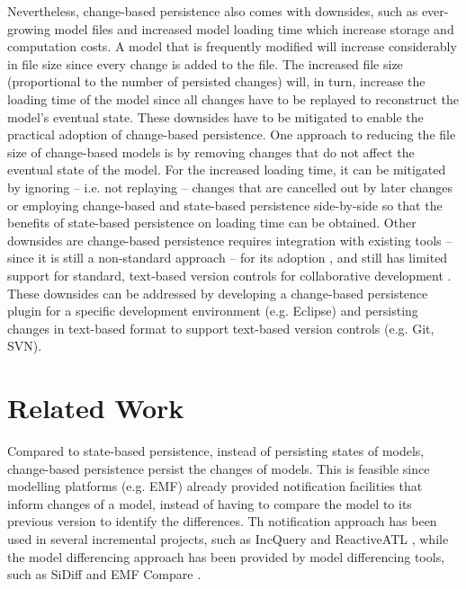 \documentclass[sigplan,review,anonymous]{acmart}\settopmatter{printfolios=true,printccs=false,printacmref=false}
\begin{document}
Nevertheless, change-based persistence also comes with downsides, such as ever-growing model files \cite{DBLP:journals/entcs/RobbesL07,DBLP:conf/edoc/KoegelHLHD10} and increased model loading time \cite{mens2002state} which increase storage and computation costs. A model that is frequently modified will increase considerably in file size since every change is added to the file. The increased file size (proportional to the number of persisted changes) will, in turn, increase the loading time of the model since all changes have to be replayed to reconstruct the model's eventual state. These downsides have to be mitigated to enable the practical adoption of change-based persistence. One approach to reducing the file size of change-based models is by removing changes that do not affect the eventual state of the model. For the increased loading time, it can be mitigated by ignoring -- i.e. not replaying -- changes that are cancelled out by later changes or employing change-based and state-based persistence side-by-side so that the benefits of state-based persistence on loading time can be obtained. Other downsides are change-based persistence requires integration with existing tools -- since it is still a non-standard approach -- for its adoption \cite{koegel2010emfstore}, and still has limited support for standard, text-based version controls for collaborative development \cite{koegel2010emfstore}. These downsides can be addressed by developing a change-based persistence plugin for a specific development environment (e.g. Eclipse) and persisting changes in text-based format to support text-based version controls (e.g. Git, SVN).


\section{Related Work}
Compared to state-based persistence, instead of persisting states of models, change-based persistence persist the changes of models. This is feasible since modelling platforms (e.g. EMF) already provided notification facilities that inform changes of a model, instead of having to compare the model to its previous version to identify the differences. Th notification approach has been used in several incremental projects, such as IncQuery \cite{DBLP:conf/ecmdafa/RathHV12} and ReactiveATL \cite{DBLP:conf/ecmdafa/OgunyomiRK15}, while the model differencing approach has been provided by model differencing tools, such as SiDiff \cite{kelter2005generic} and EMF Compare \cite{eclipse2017compare}.
\end{document}
